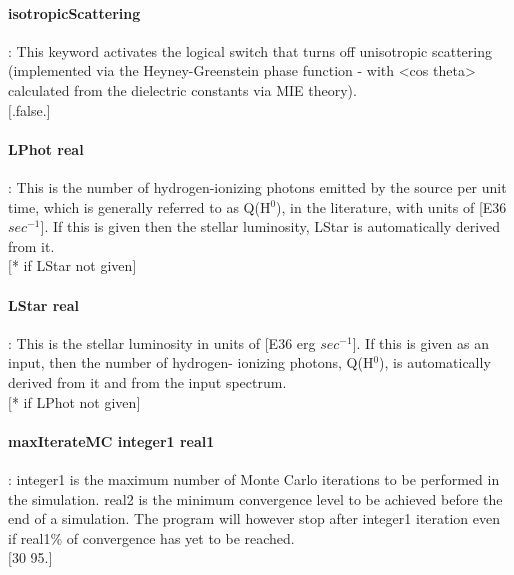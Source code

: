 \documentclass[11pt]{article}
\begin{document}
\paragraph    {isotropicScattering} : This keyword activates the logical switch that turns off unisotropic scattering 
                     (implemented via the Heyney-Greenstein phase function - with <cos theta> calculated from the dielectric 
                      constants via MIE theory).\\
		     $[$.false.$]$\\                      
\paragraph    {LPhot real	  }   : This is the number of hydrogen-ionizing photons emitted by 
		     the source per unit time, which is generally referred to as 
		     Q(H$^0$), in the literature, with units of [E36 $sec^{-1}$]. If this 
		     is given then the stellar luminosity, LStar is automatically 
		     derived from it.\\
		     $[$* if LStar not given$]$\\

\paragraph    {LStar real}	     : This is the stellar luminosity in units of [E36 erg $sec^{-1}$].
		     If this is given as an input, then the number of hydrogen-
		     ionizing photons,  Q(H$^0$), is automatically derived from it 
		     and from the input spectrum. \\
		     $[$* if LPhot not given$]$\\

\paragraph    {maxIterateMC integer1 real1}: integer1 is the maximum number of Monte Carlo iterations to 
		     be performed in the simulation. real2 is the minimum convergence level
                     to be achieved before the end of a simulation. The program will however 
		     stop after integer1 iteration even if real1\% of convergence has yet to 
		     be reached.\\
		     $[$30 95.$]$\\
\end{document}
